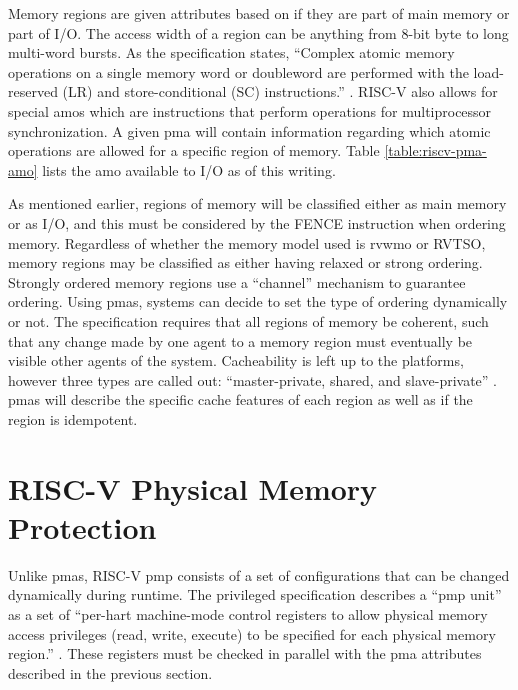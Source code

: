 Memory regions are given attributes based on if they are part of main memory or part of I/O. The access width of a region can be anything from 8-bit byte to long multi-word bursts. As the specification states, ``Complex atomic memory operations on a single memory word or doubleword are performed with the
load-reserved (LR) and store-conditional (SC) instructions.'' \cite{PrivIsa2019}. RISC-V also allows for special \glspl{amo} which are instructions that perform operations for multiprocessor synchronization. A given \gls{pma} will contain information regarding which atomic operations are allowed for a specific region of memory.  Table \ref{table:riscv-pma-amo} lists the \gls{amo} available to I/O as of this writing.

\renewcommand{\arraystretch}{1.5}


As mentioned earlier, regions of memory will be classified either as main memory or as I/O, and this must be considered by the FENCE instruction when ordering memory. Regardless of whether the memory model used is \gls{rvwmo} or RVTSO, memory regions may be classified as either having relaxed or strong ordering. Strongly ordered memory regions use a ``channel'' mechanism to guarantee ordering. Using \glspl{pma}, systems can decide to set the type of ordering dynamically or not. The specification requires that all regions of memory be coherent, such that any change made by one agent to a memory region must eventually be visible other agents of the system. Cacheability is left up to the platforms, however three types are called out: ``master-private, shared, and slave-private'' \cite{PrivIsa2019}. \glspl{pma} will describe the specific cache features of each region as well as if the region is idempotent.

\section{RISC-V Physical Memory Protection}
Unlike \glspl{pma}, RISC-V \gls{pmp} consists of a set of configurations that can be changed dynamically during runtime. The privileged specification describes a ``\gls{pmp} unit'' as a set of ``per-hart machine-mode control registers to allow physical memory access privileges (read, write, execute) to be specified for each physical memory region.'' \cite{PrivIsa2019}. These registers must be checked in parallel with the \gls{pma} attributes described in the previous section.

\renewcommand{\arraystretch}{2}


